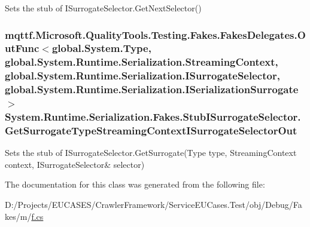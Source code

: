Sets the stub of I\-Surrogate\-Selector.\-Get\-Next\-Selector()

\hypertarget{class_system_1_1_runtime_1_1_serialization_1_1_fakes_1_1_stub_i_surrogate_selector_a959c7aafb0e0b05558596f416ab3969b}{
\subsubsection[{Get\-Surrogate\-Type\-Streaming\-Context\-I\-Surrogate\-Selector\-Out}]{\setlength{\rightskip}{0pt plus 5cm}mqttf.\-Microsoft.\-Quality\-Tools.\-Testing.\-Fakes.\-Fakes\-Delegates.\-Out\-Func$<$global.\-System.\-Type, global.\-System.\-Runtime.\-Serialization.\-Streaming\-Context, global.\-System.\-Runtime.\-Serialization.\-I\-Surrogate\-Selector, global.\-System.\-Runtime.\-Serialization.\-I\-Serialization\-Surrogate$>$ System.\-Runtime.\-Serialization.\-Fakes.\-Stub\-I\-Surrogate\-Selector.\-Get\-Surrogate\-Type\-Streaming\-Context\-I\-Surrogate\-Selector\-Out}}\label{class_system_1_1_runtime_1_1_serialization_1_1_fakes_1_1_stub_i_surrogate_selector_a959c7aafb0e0b05558596f416ab3969b}


Sets the stub of I\-Surrogate\-Selector.\-Get\-Surrogate(Type type, Streaming\-Context context, I\-Surrogate\-Selector\& selector)



The documentation for this class was generated from the following file\-:\begin{DoxyCompactItemize}
\item 
D\-:/\-Projects/\-E\-U\-C\-A\-S\-E\-S/\-Crawler\-Framework/\-Service\-E\-U\-Cases.\-Test/obj/\-Debug/\-Fakes/m/\hyperlink{m_2f_8cs}{f.\-cs}\end{DoxyCompactItemize}
